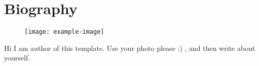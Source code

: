 \chapter*{Biography}
\vspace{-2cm}
\begin{figure}[H]
    \centering
    \texttt{[image: example-image]}
\end{figure}

Hi I am author of this template. Use your photo please :) , and then write about yourself.
